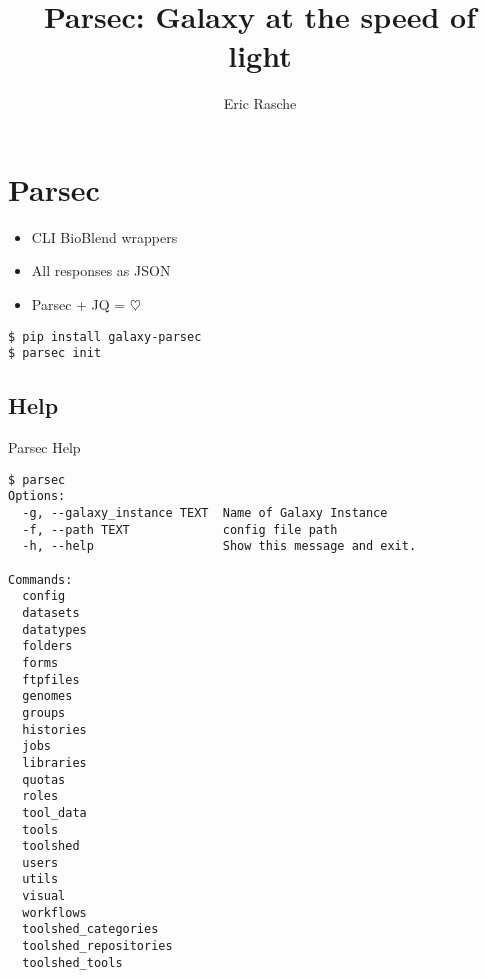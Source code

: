\documentclass[12pt]{phage3slides} %
\title[Parsec]{Parsec: Galaxy at the speed of light}
\author[ER]{Eric Rasche}
\begin{document}
\frame{\titlepage}


\section{Parsec}
\begin{frame}[fragile]
	\begin{itemize}
		\item CLI BioBlend wrappers
		\item All responses as JSON
		\item Parsec + JQ = $\heartsuit$
	\end{itemize}
\begin{verbatim}
$ pip install galaxy-parsec
$ parsec init
\end{verbatim}
\end{frame}


\subsection{Help}
\begin{frame}[fragile]{Parsec Help}

\begin{verbatim}
$ parsec
Options:
  -g, --galaxy_instance TEXT  Name of Galaxy Instance
  -f, --path TEXT             config file path
  -h, --help                  Show this message and exit.

Commands:
  config
  datasets
  datatypes
  folders
  forms
  ftpfiles
  genomes
  groups
  histories
  jobs
  libraries
  quotas
  roles
  tool_data
  tools
  toolshed
  users
  utils
  visual
  workflows
  toolshed_categories
  toolshed_repositories
  toolshed_tools
\end{verbatim}
\end{frame}
\end{document}
